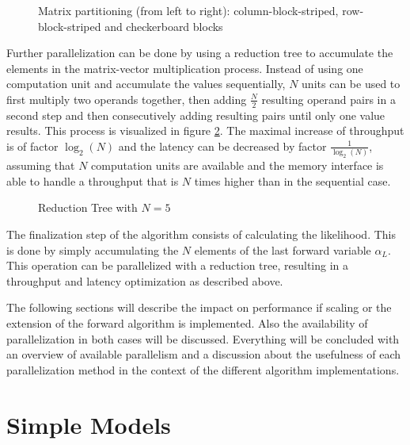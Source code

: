 \documentclass[mscthesis]{usiinfthesis}
\begin{document}
\begin{figure}
    \centering
    
    \caption{Matrix partitioning (from left to right): column-block-striped,
        row-block-striped and checkerboard blocks}
    \label{fig:matrix_partitioning}
\end{figure}

Further parallelization can be done by using a reduction tree to accumulate the
elements in the matrix-vector multiplication process. Instead of using one
computation unit and accumulate the values sequentially, $N$ units can be used
to first multiply two operands together, then adding $\frac{N}{2}$ resulting
operand pairs in a second step and then consecutively adding resulting pairs
until only one value results. This process is visualized in figure
\ref{fig:red_tree}. The maximal increase of throughput is of factor $\log_2(N)$
and the latency can be decreased by factor $\frac{1}{\log_2(N)}$, assuming that
$N$ computation units are available and the memory interface is able to handle
a throughput that is $N$ times higher than in the sequential case.

\begin{figure}
    \centering
    
    \caption{Reduction Tree with $N=5$}
    \label{fig:red_tree}
\end{figure}

The finalization step of the algorithm consists of calculating the likelihood.
This is done by simply accumulating the $N$ elements of the last forward
variable $\alpha_L$. This operation can be parallelized with a reduction tree,
resulting in a throughput and latency optimization as described above.

The following sections will describe the impact on performance if scaling or
the extension of the forward algorithm is implemented. Also the availability of
parallelization in both cases will be discussed. Everything will be concluded
with an overview of available parallelism and a discussion about the usefulness
of each parallelization method in the context of the different algorithm
implementations.

\section{Simple Models}
\label{ch:analysis_simple}
\end{document}
